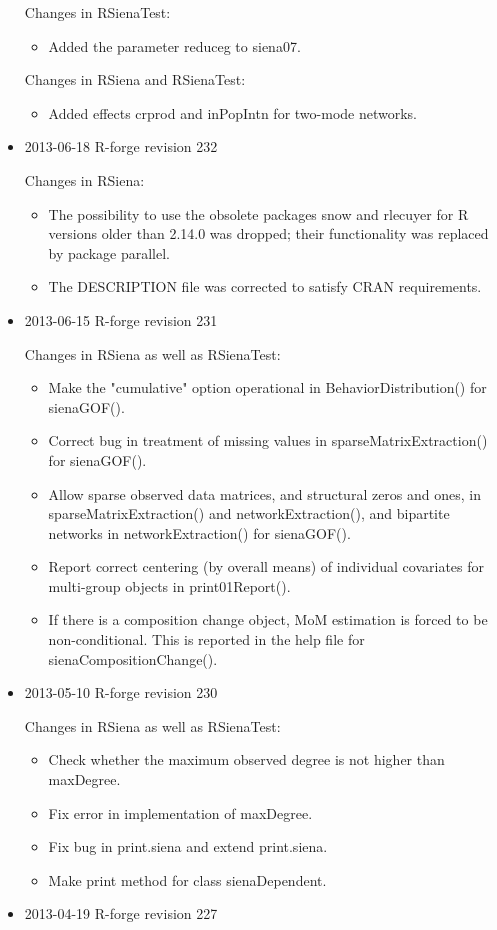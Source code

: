\documentclass[a4paper,fleqn,11pt]{article}
\newcommand{\+}{\, + \,}
\newcommand{\sfn}[1]{\textsf{#1}}
\begin{document}
\begin{small}
\begin{itemize}
Changes in RSienaTest:
  \begin{itemize}
  \item Added the parameter reduceg to siena07.
  \end{itemize}

Changes in RSiena and RSienaTest:
  \begin{itemize}
  \item Added effects crprod and inPopIntn for two-mode networks.
  \end{itemize}

\item 2013-06-18 R-forge revision 232

Changes in RSiena:
  \begin{itemize}
  \item The possibility to use the obsolete packages \sfn{snow} and
     \sfn{rlecuyer} for R versions older than 2.14.0 was dropped;
     their functionality was replaced by package \sfn{parallel}.
   \item The DESCRIPTION file was corrected to satisfy CRAN requirements.
  \end{itemize}

\item 2013-06-15 R-forge revision 231

Changes in RSiena as well as RSienaTest:
  \begin{itemize}
  \item
   Make the "cumulative" option operational in \sfn{BehaviorDistribution()}
   for \sfn{sienaGOF()}.
  \item
   Correct bug in treatment of missing values in  \sfn{sparseMatrixExtraction()}
   for  \sfn{sienaGOF()}.
  \item
    Allow sparse observed data matrices, and structural zeros and ones, in
      \sfn{sparseMatrixExtraction()} and  \sfn{networkExtraction()},
     and bipartite networks in  \sfn{networkExtraction()} for  \sfn{sienaGOF()}.
  \item
   Report correct centering (by overall means) of individual
     covariates for multi-group objects in  \sfn{print01Report()}.
  \item
   If there is a composition change object, MoM estimation is forced
     to be non-conditional. This is reported in the help file
     for  \sfn{sienaCompositionChange()}.
  \end{itemize}
\item 2013-05-10 R-forge revision 230

Changes in RSiena as well as RSienaTest:
  \begin{itemize}
   \item Check whether the maximum observed degree is not higher than
     \sfn{maxDegree}.
	\item Fix error in implementation of \sfn{maxDegree}.
	\item Fix bug in \sfn{print.siena} and extend \sfn{print.siena}.
	\item Make print method for class \sfn{sienaDependent}.
  \end{itemize}
\item 2013-04-19 R-forge revision 227


\end{itemize}
\end{small}
\end{document}
